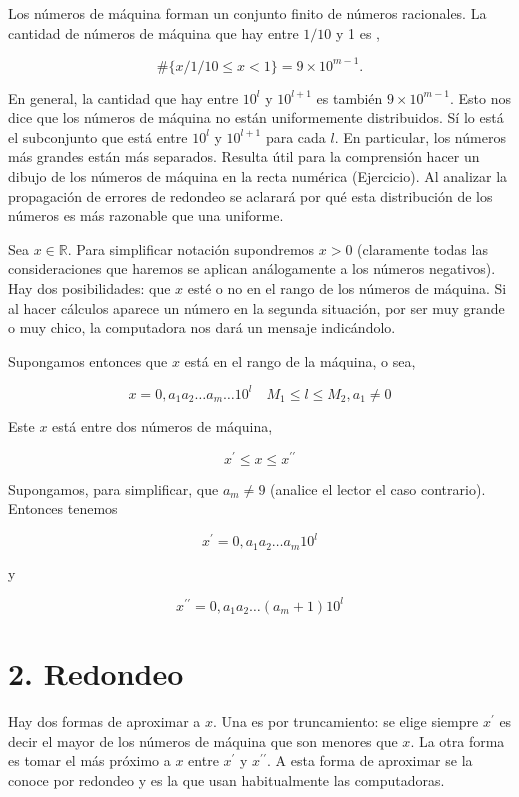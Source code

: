 \documentclass[10pt]{article}
\begin{document}
Los números de máquina forman un conjunto finito de números racionales. La cantidad de números de máquina que hay entre $1 / 10$ y 1 es ,

$$
\#\{x / 1 / 10 \leq x<1\}=9 \times 10^{m-1} .
$$

En general, la cantidad que hay entre $10^{l}$ y $10^{l+1}$ es también $9 \times 10^{m-1}$. Esto nos dice que los números de máquina no están uniformemente distribuidos. Sí lo está el subconjunto que está entre $10^{l}$ y $10^{l+1}$ para cada $l$. En particular, los números más grandes están más separados. Resulta útil para la comprensión hacer un dibujo de los números de máquina en la recta numérica (Ejercicio). Al analizar la propagación de errores de redondeo se aclarará por qué esta distribución de los números es más razonable que una uniforme.

Sea $x \in \mathbb{R}$. Para simplificar notación supondremos $x>0$ (claramente todas las consideraciones que haremos se aplican análogamente a los números negativos). Hay dos posibilidades: que $x$ esté o no en el rango de los números de máquina. Si al hacer cálculos aparece un número en la segunda situación, por ser muy grande o muy chico, la computadora nos dará un mensaje indicándolo.

Supongamos entonces que $x$ está en el rango de la máquina, o sea,

$$
x=0, a_{1} a_{2} \ldots a_{m} \ldots 10^{l} \quad M_{1} \leq l \leq M_{2}, a_{1} \neq 0
$$

Este $x$ está entre dos números de máquina,

$$
x^{\prime} \leq x \leq x^{\prime \prime}
$$

Supongamos, para simplificar, que $a_{m} \neq 9$ (analice el lector el caso contrario). Entonces tenemos

$$
x^{\prime}=0, a_{1} a_{2} \ldots a_{m} 10^{l}
$$

y

$$
x^{\prime \prime}=0, a_{1} a_{2} \ldots\left(a_{m}+1\right) 10^{l}
$$

\section*{2. Redondeo}
Hay dos formas de aproximar a $x$. Una es por truncamiento: se elige siempre $x^{\prime}$ es decir el mayor de los números de máquina que son menores que $x$. La otra forma es tomar el más próximo a $x$ entre $x^{\prime}$ y $x^{\prime \prime}$. A esta forma de aproximar se la conoce por redondeo y es la que usan habitualmente las computadoras.
\end{document}
